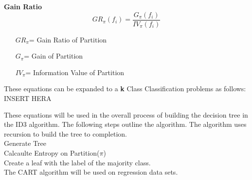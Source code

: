 \documentclass[twoside,11pt]{article}
\begin{document}
\textbf{Gain Ratio}
\begin{equation}
	GR_\pi(f_i)  = \frac{G_\pi(f_i)}{IV_\pi(f_i)}
\end{equation}
\begin{itemize}
	\item[$GR_\pi$=] Gain Ratio of Partition
	\item[$G_\pi$=] Gain of Partition
	\item[$IV_\pi$=] Information Value of Partition
\end{itemize}

These equations can be expanded to a \textbf{k} Class Classification problems as follows:\newline
INSERT HERA\newline
\newpage

These equations will be used in the overall process of building the decision tree in the ID3 algorithm. The following steps outline the algorithm. The algorithm uses recursion to build the tree to completion.\\
Generate Tree\\
Calcaulte Entropy on Partition($\pi$) \\
Create a leaf with the label of the majority class.\\




\newpage
The CART algorithm will be used on regression data sets. 
\end{document}
